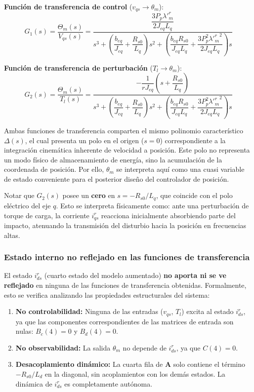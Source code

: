 \documentclass[12pt, a4paper,journal, onecolumn, compsoc]{IEEEtran}
\begin{document}
\vspace{0.3cm}
\textbf{Función de transferencia de control} ($v_{qs} \to \theta_m$):
\begin{equation} \label{eq:tf_vqs}
\boxed{
    G_1(s) = \frac{\Theta_m(s)}{V_{qs}(s)} = \frac{\dfrac{3 P_p \lambda'^r_m}{2 J_{eq} L_q}}{s^3 + \left(\dfrac{b_{eq}}{J_{eq}} + \dfrac{R_{s0}}{L_q}\right)s^2 + \left(\dfrac{b_{eq} R_{s0}}{J_{eq} L_q} + \dfrac{3 P_p^2 {\lambda'^r_m}^2}{2 J_{eq} L_q}\right)s}
}
\end{equation}

\vspace{0.3cm}
\textbf{Función de transferencia de perturbación} ($T_l \to \theta_m$):
\begin{equation} \label{eq:tf_Tl}
\boxed{
    G_2(s) = \frac{\Theta_m(s)}{T_l(s)} = \frac{-\dfrac{1}{r J_{eq}}\left(s + \dfrac{R_{s0}}{L_q}\right)}{s^3 + \left(\dfrac{b_{eq}}{J_{eq}} + \dfrac{R_{s0}}{L_q}\right)s^2 + \left(\dfrac{b_{eq} R_{s0}}{J_{eq} L_q} + \dfrac{3 P_p^2 {\lambda'^r_m}^2}{2 J_{eq} L_q}\right)s}
}
\end{equation}

Ambas funciones de transferencia comparten el mismo polinomio característico $\Delta(s)$, el cual presenta un polo en el origen ($s=0$) correspondiente a la integración cinemática inherente de velocidad a posición. Este polo no representa un modo físico de almacenamiento de energía, sino la acumulación de la coordenada de posición. Por ello, $\theta_m$ se interpreta aquí como una cuasi variable de estado conveniente para el posterior diseño del controlador de posición.

Notar que $G_2(s)$ posee un \textbf{cero} en $s = -R_{s0}/L_q$, que coincide con el polo eléctrico del eje $q$. Esto se interpreta físicamente como: ante una perturbación de torque de carga, la corriente $i_{qs}^r$ reacciona inicialmente absorbiendo parte del impacto, atenuando la transmisión del disturbio hacia la posición en frecuencias altas.

\subsubsection{Estado interno no reflejado en las funciones de transferencia}
El estado $i_{ds}^r$ (cuarto estado del modelo aumentado) \textbf{no aporta ni se ve reflejado} en ninguna de las funciones de transferencia obtenidas. Formalmente, esto se verifica analizando las propiedades estructurales del sistema:

\begin{enumerate}
    \item \textbf{No controlabilidad:} Ninguna de las entradas ($v_{qs}$, $T_l$) excita al estado $i_{ds}^r$, ya que las componentes correspondientes de las matrices de entrada son nulas: $B_c(4) = 0$ y $B_d(4) = 0$.
    \item \textbf{No observabilidad:} La salida $\theta_m$ no depende de $i_{ds}^r$, ya que $C(4) = 0$.
    \item \textbf{Desacoplamiento dinámico:} La cuarta fila de $\bm{A}$ solo contiene el término $-R_{s0}/L_d$ en la diagonal, sin acoplamientos con los demás estados. La dinámica de $i_{ds}^r$ es completamente autónoma.
\end{enumerate}
\end{document}
